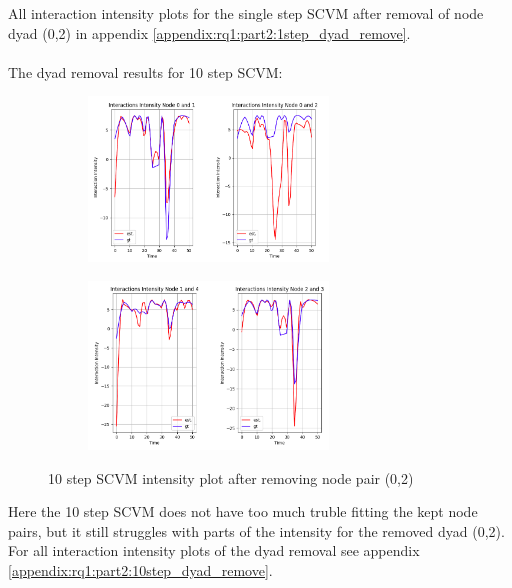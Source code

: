 All interaction intensity plots for the single step SCVM after removal of node dyad (0,2) in appendix \ref{appendix:rq1:part2:1step_dyad_remove}.
\\\\
\vspace*{-1cm}
\noindent
The dyad removal results for 10 step SCVM:
\begin{figure}[H]
    \centering
    \begin{subfigure}[b]{\textwidth}
        \centering
        \includegraphics[width=0.7\textwidth]{0_images/10step_SCVM_dyad_removal_plot1.png}
    \end{subfigure}
    \hfill
    \begin{subfigure}[b]{\textwidth}
        \centering
        \includegraphics[width=0.7\textwidth]{0_images/10step_SCVM_dyad_removal_plot2.png}
    \end{subfigure}
        \caption{10 step SCVM intensity plot after removing node pair (0,2)}
    \label{fig:RQ1:SCVM_accuracy}
\end{figure}
\noindent
Here the 10 step SCVM does not have too much truble fitting the kept node pairs, but it still struggles with parts of the intensity for the removed dyad (0,2). For all interaction intensity plots of the dyad removal see appendix \ref{appendix:rq1:part2:10step_dyad_remove}.



